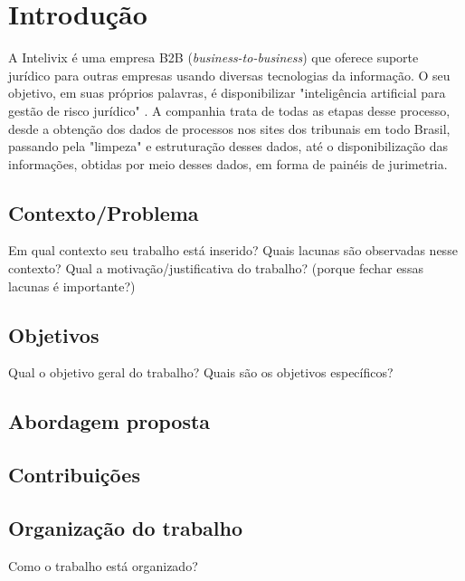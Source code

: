 \section{Introdução}
A Intelivix é uma empresa B2B (\textit{business-to-business}) que oferece suporte jurídico para outras empresas usando diversas tecnologias da informação. O seu objetivo, em suas próprios palavras, é disponibilizar "inteligência artificial para gestão de risco jurídico" \cite{intelivix:2021}. A companhia trata de todas as etapas desse processo, desde a obtenção dos dados de processos nos sites dos tribunais em todo Brasil, passando pela "limpeza" e estruturação desses dados, até o disponibilização das informações, obtidas por meio desses dados, em forma de painéis de jurimetria.

\subsection{Contexto/Problema}
 Em qual contexto seu trabalho está inserido? 
 Quais lacunas são observadas nesse contexto?
 Qual a motivação/justificativa do trabalho? (porque fechar essas lacunas é importante?)


\subsection{Objetivos}
Qual o objetivo geral do trabalho?
Quais são os objetivos específicos?

\subsection{Abordagem proposta}

\subsection{Contribuições}

\subsection{Organização do trabalho}

Como o trabalho está organizado?